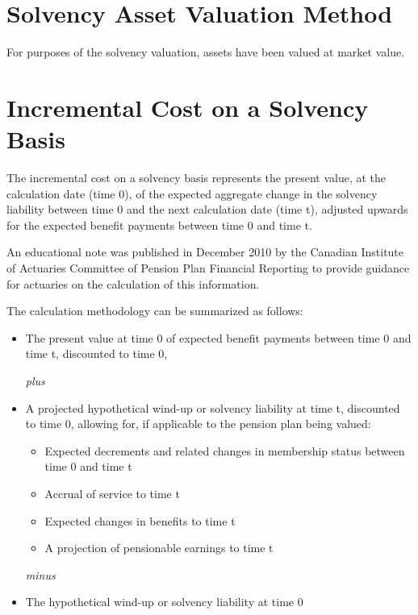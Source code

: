 \documentclass{report}
\begin{document}
\section{Solvency Asset Valuation Method}

For purposes of the solvency valuation, assets have been valued at market value.

\section{Incremental Cost on a Solvency Basis}

The incremental cost on a solvency basis represents the present value, at the calculation date (time 0), of the expected aggregate change in the solvency liability between time 0 and the next calculation date (time t), adjusted upwards for the expected benefit payments between time 0 and time t.

\vspace{3mm}
An educational note was published in December 2010 by the Canadian Institute of Actuaries Committee of Pension Plan Financial Reporting to provide guidance for actuaries on the calculation of this information.

The calculation methodology can be summarized as follows:
\begin{itemize}
\item The present value at time 0 of expected benefit payments between time 0 and time t, discounted to time 0,

\textit{plus}
\item A projected hypothetical wind-up or solvency liability at time t, discounted to time 0, allowing for, if applicable to the pension plan being valued:
\begin{itemize}
\item Expected decrements and related changes in membership status between time 0 and time t
\item Accrual of service to time t
\item Expected changes in benefits to time t
\item A projection of pensionable earnings to time t
\end{itemize} 

\textit{minus}
\item The hypothetical wind-up or solvency liability at time 0
\end{itemize}
\end{document}
